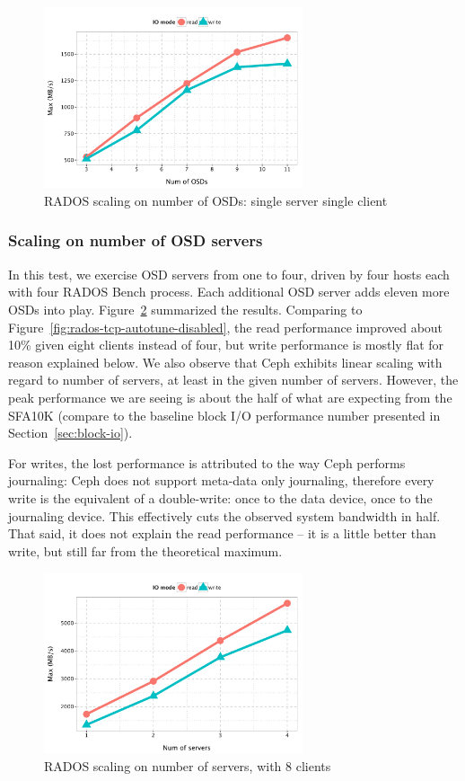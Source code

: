 \begin{figure}[htb]
\centering
\includegraphics[width=3in]{data/rados_osd}
\caption{RADOS scaling on number of OSDs: single server single client}
\label{fig:osd-scale}
\end{figure}

\subsubsection{Scaling on number of OSD servers}

In this test, we exercise OSD servers from one to four, driven by four hosts
each with four RADOS Bench process. Each additional OSD server adds eleven
more OSDs into play.  Figure~\ref{fig:oss-scale} summarized the results.
Comparing to Figure~\ref{fig:rados-tcp-autotune-disabled}, the read
performance improved about 10\% given eight clients instead of four, but write
performance is mostly flat for reason explained below. We also observe that
Ceph exhibits linear scaling with regard to number of servers, at least in the
given number of servers.  However, the peak performance we are seeing is about
the half of what are expecting from the SFA10K (compare to the baseline block
I/O performance number presented in Section~\ref{sec:block-io}).

For writes, the lost performance is attributed to the way Ceph performs
journaling: Ceph does not support meta-data only journaling, therefore every
write is the equivalent of a double-write: once to the data device, once to
the journaling device. This effectively cuts the observed system bandwidth in
half. That said, it does not explain the read performance -- it is a little
better than write, but still far from the theoretical maximum.

\begin{figure}[htb]
\centering
\includegraphics[width=3in]{data/rados_server}
\caption{RADOS scaling on number of servers, with 8 clients}
\label{fig:oss-scale}
\end{figure}

